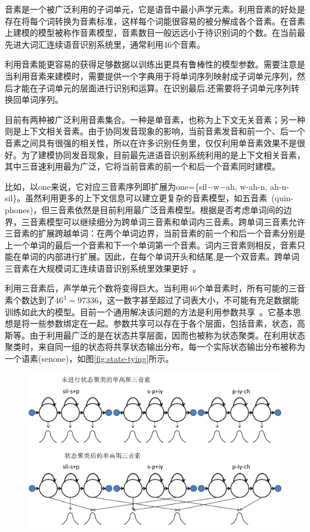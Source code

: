 音素是一个被广泛利用的子词单元，它是语音中最小声学元素。利用音素的好处是存在将每个词转换为音素标准，这样每个词能很容易的被分解成各个音素。在音素上建模的模型被称作音素模型，音素数目一般远远小于待识别词的个数。在当前最先进大词汇连续语音识别系统里，通常利用46个音素。

利用音素能更容易的获得足够数据以训练出更具有鲁棒性的模型参数。需要注意是当利用音素来建模时，需要提供一个字典用于将单词序列映射成子词单元序列，然后才能在子词单元的层面进行识别和运算。在识别最后,还需要将子词单元序列转换回单词序列。

目前有两种被广泛利用音素集合。一种是单音素，也称为上下文无关音素；另一种则是上下文相关音素。由于协同发音现象的影响，当前音素发音和前一个、后一个音素之间具有很强的相关性，所以在许多识别任务里，仅仅利用单音素效果不是很好。为了建模协同发音现象，目前最先进语音识别系统利用的是上下文相关音素，其中三音速利用最为广泛，它将当前音素的前一个和后一个音素同时建模。

比如，以one来说，它对应三音素序列即扩展为one=\{sil−w−ah, w-ah-n, ah-n-sil\}。虽然利用更多的上下文信息可以建立更复杂的音素模型，如五音素~\cite{hain2005automatic}(quin-phones)，但三音素依然是目前利用最广泛音素模型。根据是否考虑单词间的边界，三音素模型可以继续细分为跨单词三音素和单词内三音素。跨单词三音素允许三音素的扩展跨越单词：在两个单词边界，当前音素的前一个和后一个音素分别是上一个单词的最后一个音素和下一个单词第一个音素。词内三音素则相反，音素只能在单词的内部进行扩展。因此，在每个单词开头和结尾,是一个双音素。跨单词三音素在大规模词汇连续语音识别系统里效果更好~\cite{woodland1994large}。

利用三音素后，声学单元个数将变得巨大。当利用46个单音素时，所有可能的三音素个数达到了$46^3=97336$，这一数字甚至超过了词表大小，不可能有充足数据能训练如此大的模型。目前一个通用解决该问题的方法是利用参数共享~\cite{young1993use, young1994tree}。它基本思想是将一些参数绑定在一起。参数共享可以存在于各个层面，包括音素，状态，高斯等。由于利用最广泛的是在状态共享层面，因而也被称为状态聚类。在利用状态聚类时，来自同一组的状态将共享状态输出分布，每一个实际状态输出分布被称为一个语素(senone)，如图\ref{fig:state-tying}所示。
\begin{figure}[!htp]
  \centering
    \captionstyle{\centering}
    \includegraphics[width=.8\textwidth]{figure/state.png}
\end{figure}

